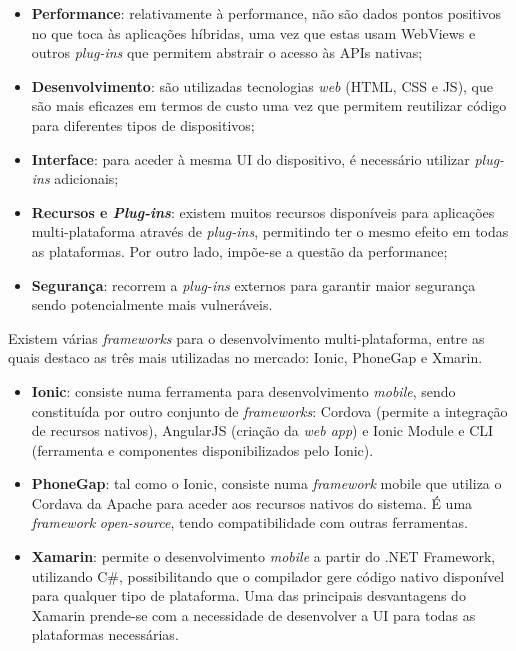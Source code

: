 \begin{itemize}
	\item \textbf{Performance}: relativamente à performance, não são dados pontos positivos no que toca às aplicações híbridas, uma vez que estas usam  WebViews e outros \textit{plug-ins} que permitem abstrair o acesso às APIs nativas; 

	
	\item \textbf{Desenvolvimento}: são utilizadas tecnologias \textit{web} (\ac{HTML}, \ac{CSS} e \ac{JS}), que são mais eficazes em termos de custo uma vez que permitem reutilizar código para diferentes tipos de dispositivos; 
	
	
	\item \textbf{Interface}: para aceder à mesma \ac{UI} do dispositivo, é necessário utilizar \textit{plug-ins} adicionais; 
	
	
	\item \textbf{Recursos e \textit{Plug-ins}}: existem muitos recursos disponíveis para aplicações \linebreak multi-plataforma através de \textit{plug-ins}, permitindo ter o mesmo efeito em todas as plataformas. Por outro lado, impõe-se a questão da performance; 

	
	\item \textbf{Segurança}: recorrem a \textit{plug-ins} externos para garantir maior segurança sendo potencialmente mais vulneráveis.
	
	
\end{itemize}

Existem várias \textit{frameworks} para o desenvolvimento multi-plataforma, entre as quais destaco as três mais utilizadas no mercado: Ionic, PhoneGap e Xmarin. 

\begin{itemize}
	\item \textbf{Ionic}: consiste numa ferramenta para desenvolvimento \textit{mobile}, sendo constituída por outro conjunto de \textit{frameworks}: Cordova (permite a integração de recursos nativos), AngularJS (criação da \textit{web app}) e Ionic Module e CLI (ferramenta e componentes disponibilizados pelo Ionic)\cite{Ionic2016}. 
	
	\item \textbf{PhoneGap}: tal como o Ionic, consiste numa \textit{framework} mobile que utiliza o Cordava da Apache para aceder aos recursos nativos do sistema. É uma \textit{framework} \textit{open-source}, tendo compatibilidade com outras ferramentas. 
	
	\item \textbf{Xamarin}: permite o desenvolvimento \textit{mobile} a partir do .NET Framework, utilizando C\#, possibilitando que o compilador gere código nativo disponível para qualquer tipo de plataforma. Uma das principais desvantagens do Xamarin prende-se com a necessidade de desenvolver a \ac{UI} para todas as plataformas necessárias. 
\end{itemize}
 


